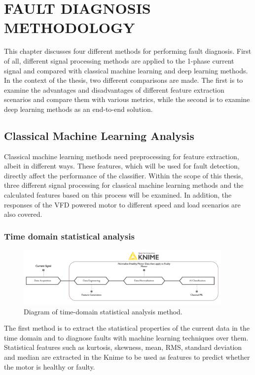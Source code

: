 \chapter{FAULT DIAGNOSIS METHODOLOGY}\label{Ch4}
This chapter discusses four different methods for performing fault diagnosis. First of all, different signal processing methods are applied to the 1-phase current signal and compared with classical machine learning and deep learning methods. In the context of the thesis, two different comparisons are made. The first is to examine the advantages and disadvantages of different feature extraction scenarios and compare them with various metrics, while the second is to examine deep learning methods as an end-to-end solution.
\section{Classical Machine Learning Analysis}

Classical machine learning methods need preprocessing for feature extraction, albeit in different ways. These features, which will be used for fault detection, directly affect the performance of the classifier. Within the scope of this thesis, three different signal processing for classical machine learning methods and the calculated features based on this process will be examined. In addition, the responses of the VFD powered motor to different speed and load scenarios are also covered.

\subsection{Time domain statistical analysis}
\begin{figure}[h]
	\centering
	\includegraphics[width=300pt,keepaspectratio=true]{./fig/method1.PNG}
	\caption{Diagram of time-domain statistical analysis method.}	
	\label{method1}
\end{figure}
The first method is to extract the statistical properties of the current data in the time domain and to diagnose faults with machine learning techniques over them. Statistical features such as kurtosis, skewness, mean, RMS, standard deviation and median are extracted in the Knime to be used as features to predict whether the motor is healthy or faulty. 

